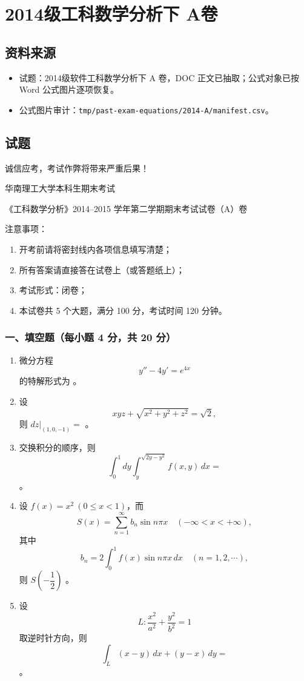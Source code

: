 \section{2014级工科数学分析下 A卷}

\subsection{资料来源}
\begin{itemize}
  \item 试题：2014级软件工科数学分析下 A 卷，DOC 正文已抽取；公式对象已按 Word 公式图片逐项恢复。
  \item 公式图片审计：\texttt{tmp/past-exam-equations/2014-A/manifest.csv}。
\end{itemize}

\subsection{试题}
诚信应考，考试作弊将带来严重后果！

华南理工大学本科生期末考试

《工科数学分析》2014--2015 学年第二学期期末考试试卷（A）卷

注意事项：
\begin{enumerate}
  \item 开考前请将密封线内各项信息填写清楚；
  \item 所有答案请直接答在试卷上（或答题纸上）；
  \item 考试形式：闭卷；
  \item 本试卷共 5 个大题，满分 100 分，考试时间 120 分钟。
\end{enumerate}

\subsubsection*{一、填空题（每小题 4 分，共 20 分）}
\begin{enumerate}
  \item 微分方程
  \[
  y''-4y'=e^{4x}
  \]
  的特解形式为 \underline{\hspace{4cm}}。
  \item 设
  \[
  xyz+\sqrt{x^2+y^2+z^2}=\sqrt2,
  \]
  则 $\left.dz\right|_{(1,0,-1)}=$ \underline{\hspace{3cm}}。
  \item 交换积分的顺序，则
  \[
  \int_0^1dy\int_y^{\sqrt{2y-y^2}}f(x,y)\,dx=
  \]
  \underline{\hspace{3cm}}。
  \item 设 $f(x)=x^2\ (0\le x<1)$，而
  \[
  S(x)=\sum_{n=1}^{\infty}b_n\sin n\pi x\quad(-\infty<x<+\infty),
  \]
  其中
  \[
  b_n=2\int_0^1 f(x)\sin n\pi x\,dx\quad(n=1,2,\cdots),
  \]
  则 $S\!\left(-\dfrac12\right)$ \underline{\hspace{3cm}}。
  \item 设
  \[
  L:\frac{x^2}{a^2}+\frac{y^2}{b^2}=1
  \]
  取逆时针方向，则
  \[
  \int_L(x-y)\,dx+(y-x)\,dy=
  \]
  \underline{\hspace{3cm}}。
\end{enumerate}


